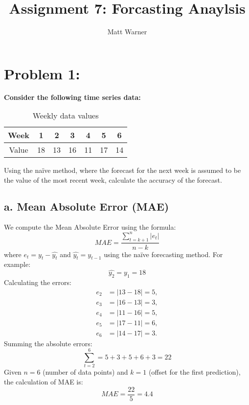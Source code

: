 \documentclass{report}
\title{\Huge{Assignment 7: Forcasting Anaylsis}}
\author{\huge{Matt Warner}}
\date{\huge{}}
\begin{document}
  \maketitle
\section*{Problem 1:}

\noindent \textbf{Consider the following time series data:}

\begin{table}[ht]
\centering
\begin{tabular}{@{}ccccccc@{}} 
\toprule 
Week & 1 & 2 & 3 & 4 & 5 & 6 \\ 
\midrule
Value & 18 & 13 & 16 & 11 & 17 & 14 \\
\bottomrule
\end{tabular}
\caption{Weekly data values}
\label{tab:weekly_values}
\end{table}

\noindent Using the naïve method, where the forecast for the next week is assumed to be the value of the most recent week, calculate the accuracy of the forecast.

\subsection*{a. Mean Absolute Error (MAE)}

\noindent We compute the Mean Absolute Error using the formula:
\[ MAE = \dfrac{\displaystyle \sum_{t = k + 1}^{n} |e_t|}{n-k} \]
where \( e_t = y_t - \hat{y_t} \) and \( \hat{y_t} = y_{t-1} \) using the naïve forecasting method.
\bigbreak \noindent
For example:
\[ \hat{y_2} = y_1 = 18 \]
\bigbreak \noindent
Calculating the errors:
\[ \begin{aligned}
e_2 &= |13 - 18| = 5, \\
e_3 &= |16 - 13| = 3, \\
e_4 &= |11 - 16| = 5, \\
e_5 &= |17 - 11| = 6, \\
e_6 &= |14 - 17| = 3.
\end{aligned} \]
\bigbreak \noindent
Summing the absolute errors:
\[ \sum_{t = 2}^{6} = 5 + 3 + 5 + 6 + 3 = 22 \]
\bigbreak \noindent
Given \( n = 6 \) (number of data points) and \( k = 1 \) (offset for the first prediction), the calculation of MAE is:
\[ MAE = \dfrac{22}{5} = 4.4 \]
\end{document}
